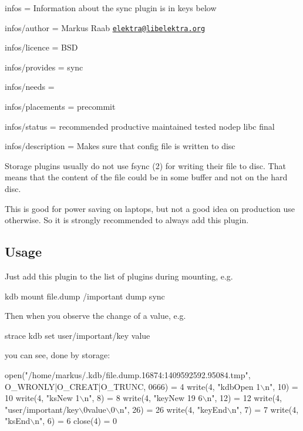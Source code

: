 
\begin{DoxyItemize}
\item infos = Information about the sync plugin is in keys below
\item infos/author = Markus Raab \href{mailto:elektra@libelektra.org}{\tt elektra@libelektra.\+org}
\item infos/licence = B\+SD
\item infos/provides = sync
\item infos/needs =
\item infos/placements = precommit
\item infos/status = recommended productive maintained tested nodep libc final
\item infos/description = Makes sure that config file is written to disc
\end{DoxyItemize}

Storage plugins usually do not use fsync (2) for writing their file to disc. That means that the content of the file could be in some buffer and not on the hard disc.

This is good for power saving on laptops, but not a good idea on production use otherwise. So it is strongly recommended to always add this plugin.

\subsection*{Usage}

Just add this plugin to the list of plugins during mounting, e.\+g.


\begin{DoxyCode}
kdb mount file.dump /important dump sync
\end{DoxyCode}


Then when you observe the change of a value, e.\+g.


\begin{DoxyCode}
strace kdb set user/important/key value
\end{DoxyCode}


you can see, done by storage\+:


\begin{DoxyCode}
open("/home/markus/.kdb/file.dump.16874:1409592592.95084.tmp",
        O\_WRONLY|O\_CREAT|O\_TRUNC, 0666) = 4
write(4, "kdbOpen 1\(\backslash\)n", 10)             = 10
write(4, "ksNew 1\(\backslash\)n", 8)                = 8
write(4, "keyNew 19 6\(\backslash\)n", 12)           = 12
write(4, "user/important/key\(\backslash\)0value\(\backslash\)0\(\backslash\)n", 26) = 26
write(4, "keyEnd\(\backslash\)n", 7)                 = 7
write(4, "ksEnd\(\backslash\)n", 6)                  = 6
close(4)                                = 0
\end{DoxyCode}


